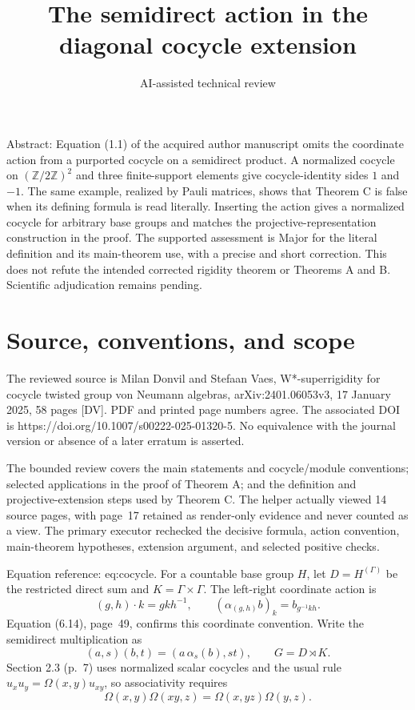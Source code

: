 \documentclass[10pt]{article}
\title{The semidirect action in the diagonal cocycle extension}
\author{AI-assisted technical review}
\date{}
\begin{document}
\maketitle
Abstract: Equation (1.1) of the acquired author manuscript omits the coordinate action from a purported cocycle on a semidirect product. A normalized cocycle on \((\mathbb Z/2\mathbb Z)^2\) and three finite-support elements give cocycle-identity sides \(1\) and \(-1\). The same example, realized by Pauli matrices, shows that Theorem C is false when its defining formula is read literally. Inserting the action gives a normalized cocycle for arbitrary base groups and matches the projective-representation construction in the proof. The supported assessment is Major for the literal definition and its main-theorem use, with a precise and short correction. This does not refute the intended corrected rigidity theorem or Theorems A and B. Scientific adjudication remains pending.\par
\section*{Source, conventions, and scope}
The reviewed source is Milan Donvil and Stefaan Vaes, W*-superrigidity for cocycle twisted group von Neumann algebras, arXiv:2401.06053v3, 17 January 2025, 58 pages [DV]. PDF and printed page numbers agree. The associated DOI is https://doi.org/10.1007/s00222-025-01320-5. No equivalence with the journal version or absence of a later erratum is asserted.\par
The bounded review covers the main statements and cocycle/module conventions; selected applications in the proof of Theorem A; and the definition and projective-extension steps used by Theorem C. The helper actually viewed 14 source pages, with page 17 retained as render-only evidence and never counted as a view. The primary executor rechecked the decisive formula, action convention, main-theorem hypotheses, extension argument, and selected positive checks.\par
Equation reference: eq:cocycle. For a countable base group \(H\), let \(D=H^{(\Gamma)}\) be the restricted direct sum and \(K=\Gamma\times\Gamma\). The left-right coordinate action is \[(g,h)\cdot k=gkh^{-1},\qquad
 (\alpha_{(g,h)}b)_k=b_{g^{-1}kh}.\] Equation (6.14), page 49, confirms this coordinate convention. Write the semidirect multiplication as \[(a,s)(b,t)=(a\,\alpha_s(b),st),\qquad G=D\rtimes K.\] Section 2.3 (p. 7) uses normalized scalar cocycles and the usual rule \(u_xu_y=\Omega(x,y)u_{xy}\), so associativity requires \[
 \Omega(x,y)\Omega(xy,z)=\Omega(x,yz)\Omega(y,z).\]\par
\end{document}
